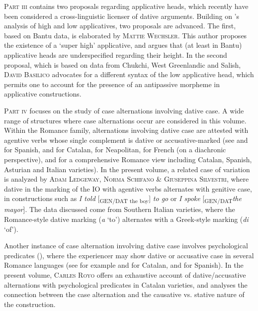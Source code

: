 \documentclass[output=paper,modfonts,nonflat,colorlinks,citecolor=brown]{langsci/langscibook}
\begin{document}
{\textsc{Part iii}} contains two proposals regarding applicative heads, which recently have been considered a cross-linguistic licenser of dative arguments. Building on \citeauthor{Pylkkänen2002}'s \citeyear{Pylkkänen2002, Pylkkänen2008} analysis of high and low applicatives, two proposals are advanced. The first, based on Bantu data, is elaborated by {\textsc{Mattie Wechsler}}. This author proposes the existence of a ‘super high’ applicative, and argues that (at least in Bantu) applicative heads are underspecified regarding their height. In the second proposal, which is based on data from Chukchi, West Greenlandic and Salish, {\textsc{David Basilico}} advocates for a different syntax of the low applicative head, which permits one to account for the presence of an antipassive morpheme in applicative constructions.



{\textsc{Part iv}} focuses on the study of case alternations involving dative case. A wide range of structures where case alternations occur are considered in this volume. Within the Romance family, alternations involving dative case are attested with agentive verbs whose single complement is dative or accusative-marked (see \citealt{FernándezOrdóñez1999} and \citealt{Sáez2009} for Spanish, \citealt{Ramos2005,Morant2008,PinedaRoyo2017} and \citet{Pinedainpressb}
for Catalan, \citealt{Ledgeway2000} for Neapolitan, \citealt{Troberg2008} for French (on a diachronic perspective), and \citealt{Pineda2016} for a comprehensive Romance view including Catalan, Spanish, Asturian and Italian varieties). In the present volume, a related case of variation is analyzed by {\textsc{Adam Ledgeway, Norma Schifano \& Giuseppina Silvestri}}, where dative in the marking of the IO with agentive verbs alternates with genitive case, in constructions such as {\textit{I told}} [{\textsubscript{GEN/DAT the boy}}]{ \textit{to go}} or {\textit{I spoke}} [{\textsubscript{GEN/DAT}\textit{the mayor}}]. The data discussed come from Southern Italian varieties, where the Romance-style dative marking ({\textit{a}} ‘to’) alternates with a Greek-style marking ({\textit{di}} ‘of’).



Another instance of case alternation involving dative case involves psychological predicates ({\citealt{BellettiRizzi1988}}), where the experiencer may show dative or accusative case in several Romance languages (see for example \citealt{CabréMateu1998,PinedaRoyo2017} and \citealt{Royo2017} for Catalan, and \citealt{FernándezOrdóñez1999} for Spanish). In the present volume, {\textsc{Carles Royo}} offers an exhaustive account of dative/accusative alternations with psychological predicates in Catalan varieties, and analyses the connection between the case alternation and the causative vs. stative nature of the construction.
\end{document}
